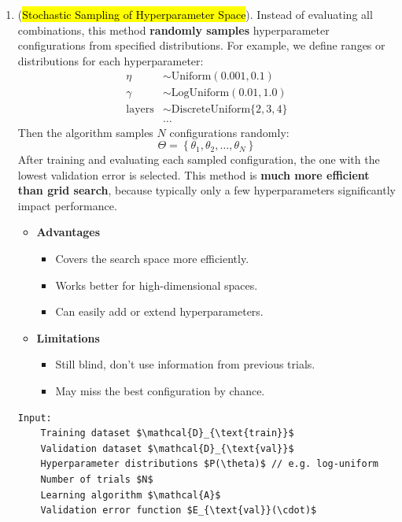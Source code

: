 \begin{enumerate}
    \item {} (\hl{Stochastic Sampling of Hyperparameter Space}). Instead of evaluating all combinations, this method \textbf{randomly samples} hyperparameter configurations from specified distributions. For example, we define ranges or distributions for each hyperparameter:
    \begin{align*}
        \eta &\sim \text{Uniform}(0.001, 0.1) \\[.3em]
        \gamma &\sim \text{LogUniform}(0.01, 1.0) \\[.3em]
        \text{layers} &\sim \text{DiscreteUniform}\{2, 3, 4\} \\[.3em]
        & \ldots
    \end{align*}
    Then the algorithm samples $N$ configurations randomly:
    \begin{equation*}
        \Theta = \left\{\theta_1, \theta_2, \dots, \theta_N\right\}
    \end{equation*}
    After training and evaluating each sampled configuration, the one with the lowest validation error is selected. This method is \textbf{much more efficient than grid search}, because typically only a few hyperparameters significantly impact performance.
    \begin{itemize}
        \item[\textcolor{Green3}{\faIcon{check}}] \textcolor{Green3}{\textbf{Advantages}}
        \begin{itemize}
            \item[\textcolor{Green3}{\faIcon{check}}] Covers the search space more efficiently.
            \item[\textcolor{Green3}{\faIcon{check}}] Works better for high-dimensional spaces.
            \item[\textcolor{Green3}{\faIcon{check}}] Can easily add or extend hyperparameters.
        \end{itemize}
        \item[\textcolor{Red3}{\faIcon{exclamation-triangle}}] \textcolor{Red2}{\textbf{Limitations}}
        \begin{itemize}
            \item[\textcolor{Red2}{\faIcon{times}}] Still blind, don't use information from previous trials.
            \item[\textcolor{Red2}{\faIcon{times}}] May miss the best configuration by chance.
        \end{itemize}
    \end{itemize}
    \begin{lstlisting}[language=pseudo-code,mathescape=true,style={pseudocode-style},caption={Random Search}]
Input:
    Training dataset $\mathcal{D}_{\text{train}}$
    Validation dataset $\mathcal{D}_{\text{val}}$
    Hyperparameter distributions $P(\theta)$ // e.g. log-uniform
    Number of trials $N$
    Learning algorithm $\mathcal{A}$
    Validation error function $E_{\text{val}}(\cdot)$


\end{lstlisting}
\end{enumerate}
